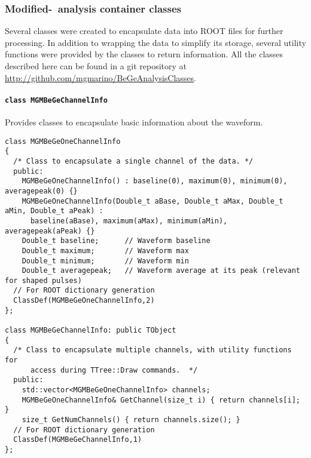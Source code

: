 			\subsubsection{Modified-\bege~analysis container classes}
Several classes were created to encapsulate data into ROOT files for further processing.  In addition to wrapping the data to simplify its storage, several utility functions were provided by the classes to return information.  All the classes described here can be found in a git repository at \url{http://github.com/mgmarino/BeGeAnalysisClasses}.  
				\paragraph{\lstinline!class MGMBeGeChannelInfo!}
Provides classes to encapsulate basic information about the waveform.
					\begin{lstlisting}
class MGMBeGeOneChannelInfo
{
  /* Class to encapsulate a single channel of the data. */
  public:
    MGMBeGeOneChannelInfo() : baseline(0), maximum(0), minimum(0), averagepeak(0) {}
    MGMBeGeOneChannelInfo(Double_t aBase, Double_t aMax, Double_t aMin, Double_t aPeak) : 
      baseline(aBase), maximum(aMax), minimum(aMin), averagepeak(aPeak) {}
    Double_t baseline;		// Waveform baseline
    Double_t maximum;		// Waveform max
    Double_t minimum; 		// Waveform min
    Double_t averagepeak; 	// Waveform average at its peak (relevant for shaped pulses)
  // For ROOT dictionary generation    
  ClassDef(MGMBeGeOneChannelInfo,2)
};

class MGMBeGeChannelInfo: public TObject
{
  /* Class to encapsulate multiple channels, with utility functions for
      access during TTree::Draw commands.  */
  public:
    std::vector<MGMBeGeOneChannelInfo> channels;
    MGMBeGeOneChannelInfo& GetChannel(size_t i) { return channels[i]; } 
    size_t GetNumChannels() { return channels.size(); }
  // For ROOT dictionary generation
  ClassDef(MGMBeGeChannelInfo,1)
};					
					\end{lstlisting}					
